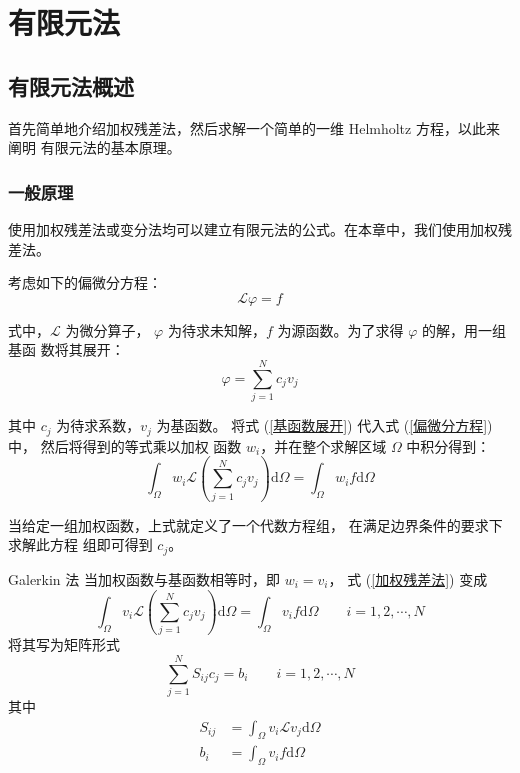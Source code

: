 \chapter{有限元法}

\section{有限元法概述}

\par 首先简单地介绍加权残差法，然后求解一个简单的一维 Helmholtz 方程，以此来阐明
有限元法的基本原理。

\subsection{一般原理}

\par 使用加权残差法或变分法均可以建立有限元法的公式。在本章中，我们使用加权残
差法。

\par 考虑如下的偏微分方程：
\begin{equation}
    \mathcal{L}\varphi = f
    \label{偏微分方程}
\end{equation}
\par 式中，$\mathcal{L}$ 为微分算子，
$\varphi$ 为待求未知解，$f$ 为源函数。为了求得 $\varphi$ 的解，用一组基函
数将其展开：
\begin{equation}
    \varphi = \sum_{j=1}^{N} c_j v_j
    \label{基函数展开}
\end{equation}
\par 其中 $c_j$ 为待求系数，$v_j$ 为基函数。
将式 (\ref{基函数展开}) 代入式 (\ref{偏微分方程}) 中，
然后将得到的等式乘以加权
函数 $w_i$，并在整个求解区域 $\Omega$ 中积分得到：
\begin{equation}
    \int_{\Omega} w_i \mathcal{L}\left(\sum_{j=1}^{N} c_j v_j\right)
     \text{d}\Omega = \int_{\Omega} w_i f \text{d}\Omega
    \label{加权残差法}
\end{equation}
\par 当给定一组加权函数，上式就定义了一个代数方程组，
在满足边界条件的要求下求解此方程
组即可得到 $c_j$。

\begin{theorem}{Galerkin 法}
    当加权函数与基函数相等时，即 $w_i = v_i$，
    式 (\ref{加权残差法}) 变成
    \begin{equation}
        \int_{\Omega} v_i \mathcal{L}\left(\sum_{j=1}^{N} c_j v_j\right)
        \text{d}\Omega = \int_{\Omega} v_i f \text{d}\Omega
        \qquad i = 1, 2, \cdots, N
    \end{equation}
    将其写为矩阵形式
    \begin{equation}
        \sum_{j=1}^{N} S_{ij} c_j = b_i \qquad i = 1, 2, \cdots, N
    \end{equation}
    其中
    \begin{align}
        S_{ij} &= \int_{\Omega} v_i \mathcal{L} v_j \text{d}\Omega \\
        b_i &= \int_{\Omega} v_i f \text{d}\Omega
    \end{align}
\end{theorem}

